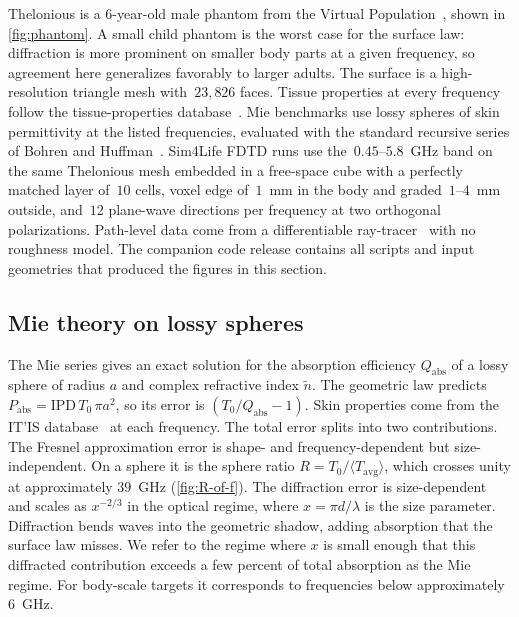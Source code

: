 \documentclass[journal,twocolumn,10pt]{IEEEtran}
\newcommand{\IPD}{\mathrm{IPD}}
\newcommand{\Tavg}{T_{\mathrm{avg}}}
\newcommand{\ntilde}{\tilde{n}}
\begin{document}
Thelonious is a 6-year-old male phantom from the Virtual
Population~\cite{ITISv5}, shown in \cref{fig:phantom}. A small child
phantom is the worst case for the surface law: diffraction is more
prominent on smaller body parts at a given frequency, so agreement
here generalizes favorably to larger adults. The surface is
a high-resolution triangle mesh with~$23{,}826$ faces. Tissue
properties at every frequency follow the tissue-properties
database~\cite{ITISv5,Gabriel1996}. Mie
benchmarks use lossy spheres of skin permittivity at the listed
frequencies, evaluated with the standard recursive series of Bohren
and Huffman~\cite{BohrenHuffman1983}. Sim4Life FDTD runs use the~$0.45$--$5.8$~GHz band on the same
Thelonious mesh embedded in a free-space cube with a perfectly matched
layer of~$10$ cells, voxel edge of~$1$~mm in the body and
graded~$1$--$4$~mm outside, and~$12$ plane-wave directions per
frequency at two orthogonal polarizations. Path-level data come from a
differentiable ray-tracer~\cite{SionnaRT} with no roughness model. The
companion code release contains all scripts and input geometries that
produced the figures in this section.

\subsection{Mie theory on lossy spheres}\label{subsec:val-mie}

The Mie series gives an exact solution for the absorption
efficiency $Q_{\mathrm{abs}}$ of a lossy sphere of radius $a$ and
complex refractive index $\ntilde$. The geometric law predicts
$P_{\mathrm{abs}} = \IPD\,T_0\,\pi a^2$, so its error is
$(T_0/Q_{\mathrm{abs}} - 1)$. Skin properties come from the
IT'IS database~\cite{ITISv5,Gabriel1996} at each frequency. The total error splits into two
contributions. The Fresnel approximation error is shape- and
frequency-dependent but size-independent. On a sphere it is the
sphere ratio $R = T_0/\langle\Tavg\rangle$, which crosses unity at
approximately $39$~GHz (\cref{fig:R-of-f}). The diffraction error is
size-dependent and scales as $x^{-2/3}$ in the optical regime, where
$x = \pi d/\lambda$ is the size parameter. Diffraction bends waves
into the geometric shadow, adding absorption that the surface law
misses. We refer to the regime where $x$ is small enough that this
diffracted contribution exceeds a few percent of total absorption as
the Mie regime. For body-scale targets it corresponds to
frequencies below approximately $6$~GHz.
\end{document}
